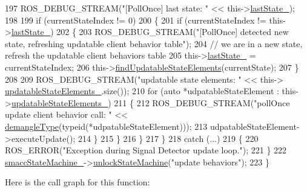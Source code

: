 \begin{DoxyCode}
197             ROS\_DEBUG\_STREAM(\textcolor{stringliteral}{"[PollOnce] last state: "} << this->\hyperlink{classsmacc_1_1SignalDetector_a72293ed0e98f4200fbe75b53f1e41eab}{lastState\_});
198 
199             \textcolor{keywordflow}{if} (currentStateIndex != 0)
200             \{
201                 \textcolor{keywordflow}{if} (currentStateIndex != this->\hyperlink{classsmacc_1_1SignalDetector_a72293ed0e98f4200fbe75b53f1e41eab}{lastState\_})
202                 \{
203                     ROS\_DEBUG\_STREAM(\textcolor{stringliteral}{"[PollOnce] detected new state, refreshing updatable client behavior
       table"});
204                     \textcolor{comment}{// we are in a new state, refresh the updatable client behaviors table}
205                     this->\hyperlink{classsmacc_1_1SignalDetector_a72293ed0e98f4200fbe75b53f1e41eab}{lastState\_} = currentStateIndex;
206                     this->\hyperlink{classsmacc_1_1SignalDetector_a443234ebdf8cedd45cde725e64639dfe}{findUpdatableStateElements}(currentState);
207                 \}
208 
209                 ROS\_DEBUG\_STREAM(\textcolor{stringliteral}{"updatable state elements: "} << this->
      \hyperlink{classsmacc_1_1SignalDetector_a07a5e7bb00c348435d954e22682fa610}{updatableStateElements\_}.size());
210                 \textcolor{keywordflow}{for} (\textcolor{keyword}{auto} *udpatableStateElement : this->\hyperlink{classsmacc_1_1SignalDetector_a07a5e7bb00c348435d954e22682fa610}{updatableStateElements\_})
211                 \{
212                     ROS\_DEBUG\_STREAM(\textcolor{stringliteral}{"pollOnce update client behavior call: "} << 
      \hyperlink{namespacesmacc_1_1introspection_a670e39ccea29952859df4e2d0e45077b}{demangleType}(\textcolor{keyword}{typeid}(*udpatableStateElement)));
213                     udpatableStateElement->executeUpdate();
214                 \}
215             \}
216         \}
217     \}
218     \textcolor{keywordflow}{catch} (...)
219     \{
220         ROS\_ERROR(\textcolor{stringliteral}{"Exception during Signal Detector update loop."});
221     \}
222     \hyperlink{classsmacc_1_1SignalDetector_a46025de6ac7b5980e22144f9703236a4}{smaccStateMachine\_}->\hyperlink{classsmacc_1_1ISmaccStateMachine_ae2e3ceb87bfe3f9d8bf320e36071fdc7}{unlockStateMachine}(\textcolor{stringliteral}{"update behaviors"});
223 \}
\end{DoxyCode}
Here is the call graph for this function\+:
\nopagebreak
